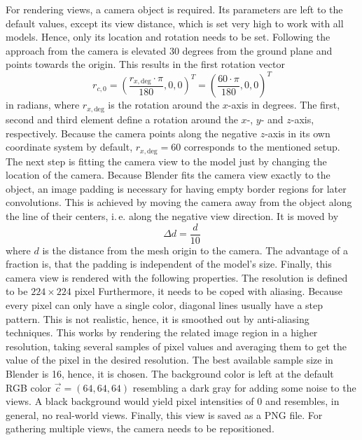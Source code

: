 For rendering views, a camera object is required.
Its parameters are left to the default values, except its view distance, which is set very high to work with all models.
Hence, only its location and rotation needs to be set.
Following the approach from \cite{Su:2015:MCN:2919332.2919750, Su2018} the camera is elevated 30 degrees from the ground plane and points towards the origin.
This results in the first rotation vector
\begin{equation}
	r_{c,0} = \left( \frac{r_{x,\text{deg}} \cdot \pi}{180}, 0, 0 \right)^T = \left( \frac{60 \cdot \pi}{180}, 0, 0 \right)^T
\end{equation}
in radians, where $r_{x,\text{deg}}$ is the rotation around the $x$-axis in degrees.
The first, second and third element define a rotation around the $x$-, $y$- and $z$-axis, respectively.
Because the camera points along the negative $z$-axis in its own coordinate system by default, $r_{x,\text{deg}} = 60$ corresponds to the mentioned setup.
The next step is fitting the camera view to the model just by changing the location of the camera.
Because Blender fits the camera view exactly to the object, an image padding is necessary for having empty border regions for later convolutions.
This is achieved by moving the camera away from the object along the line of their centers, i.\,e. along the negative view direction.
It is moved by
\begin{equation}
	\Delta d = \frac{d}{10}
\end{equation}
where $d$ is the distance from the mesh origin to the camera.
The advantage of a fraction is, that the padding is independent of the model's size.
Finally, this camera view is rendered with the following properties.
The resolution is defined to be $224 \times 224$ pixel
Furthermore, it needs to be coped with aliasing.
Because every pixel can only have a single color, diagonal lines usually have a step pattern.
This is not realistic, hence, it is smoothed out by anti-aliasing techniques.
This works by rendering the related image region in a higher resolution, taking several samples of pixel values and averaging them to get the value of the pixel in the desired resolution.
The best available sample size in Blender is 16, hence, it is chosen.
The background color is left at the default RGB color $\vec{c} = (64, 64, 64)$ resembling a dark gray for adding some noise to the views.
A black background would yield pixel intensities of 0 and resembles, in general, no real-world views.
Finally, this view is saved as a PNG file.
For gathering multiple views, the camera needs to be repositioned.
